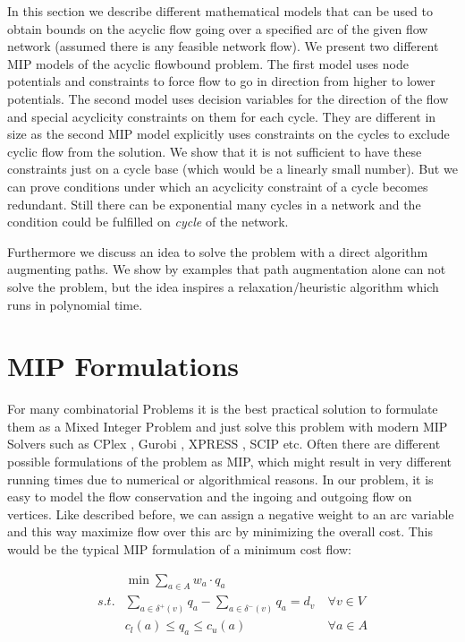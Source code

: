 In this section we describe different mathematical models that can be used to obtain bounds on the acyclic flow going 
over a specified arc of the given flow network (assumed there is any feasible network flow). We present two different 
MIP models of the acyclic flowbound problem. The first model uses node potentials and constraints to force flow to 
go in direction from higher to lower potentials. The second model uses decision variables for the direction of the 
flow and special acyclicity constraints on them for each cycle. They are different in size as the second MIP model 
explicitly uses constraints on the cycles to exclude cyclic flow from the solution. We show that it is not sufficient 
to have these constraints just on a cycle base (which would be a linearly small number). But we can prove 
conditions under which an acyclicity constraint of a cycle becomes redundant. Still there can be exponential many 
cycles in a network and the condition could be fulfilled on \textit{cycle} of the network. 

Furthermore we discuss an idea to solve the problem with a direct algorithm augmenting paths. We show by examples that 
path augmentation alone can not solve the problem, but the idea inspires a relaxation/heuristic algorithm which runs in 
polynomial time.


\section{MIP Formulations}
For many combinatorial Problems it is the best practical solution to formulate them as a Mixed Integer Problem and just 
solve this problem with modern MIP Solvers such as CPlex \cite{cplex}, Gurobi \cite{gurobi}, XPRESS \cite{xpress}, SCIP 
\cite{scip} etc. Often there are different possible 
formulations of the problem as MIP, which might result in very different running times due to numerical or algorithmical 
reasons. In our problem, it is easy to model the flow conservation and the ingoing and outgoing flow on vertices. Like 
described before, we can assign a negative weight to an arc variable and this way maximize flow over this arc by 
minimizing the overall cost. This would be the typical MIP formulation of a minimum cost flow:

\begin{align*}
  &\min \sum_{a\in A} w_a\cdot q_a  \\
 s.t. & \sum_{a\in \delta^+(v)}q_a - \sum_{a\in\delta^- (v)}q_a = d_v\ &\forall v\in V \\
  & c_l(a)\le q_a \le c_u(a) & \forall a\in A
\end{align*}

